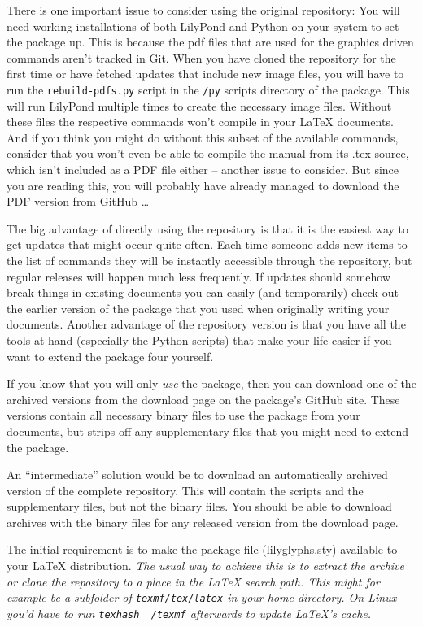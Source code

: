 \documentclass{article}
\begin{document}
There is one important issue to consider using the original repository: You will need working installations of both LilyPond and Python on your system to set the package up.
This is because the pdf files that are used for the graphics driven commands aren't tracked in Git.
When you have cloned the repository for the first time or have fetched updates that include new image files, you will have to run the \texttt{rebuild-pdfs.py} script in the \texttt{/py} scripts directory of the package.
This will run LilyPond multiple times to create the necessary image files.
Without these files the respective commands won't compile in your \LaTeX{} documents.
And if you think you might do without this subset of the available commands, consider that you won't even be able to compile the manual from its .tex source, which isn't included as a PDF file either -- another issue to consider.
But since you are reading this, you will probably have already managed to download the PDF version from GitHub \dots

The big advantage of directly using the repository is that it is the easiest way to get updates that might occur quite often. 
Each time someone adds new items to the list of commands they will be instantly accessible through the repository, but regular releases will happen much less frequently.
If updates should somehow break things in existing documents you can easily (and temporarily) check out the earlier version of the package that you used when originally writing your documents.
Another advantage of the repository version is that you have all the tools at hand (especially the Python scripts) that make your life easier if you want to extend the package four yourself.

If you know that you will only \emph{use} the \lilyglyphs package, then you can download one of the archived versions from the download page on the package's GitHub site.
These versions contain all necessary binary files to use the package from your documents, but strips off any supplementary files that you might need to extend the package.

An “intermediate” solution would be to download an automatically archived version of the complete repository. 
This will contain the scripts and the supplementary files, but not the binary files.
You should be able to download archives with the binary files for any released version from the download page.

\medskip
The initial requirement is to make the package file (lilyglyphs.sty) available to your \LaTeX{} distribution. \textit{The usual way to achieve this is to extract the archive or clone the repository to a place in the \LaTeX{} search path. This might for example be a subfolder of \texttt{texmf/tex/latex} in your home directory. On Linux you'd have to run \texttt{texhash ~/texmf} afterwards to update \LaTeX's cache.}
\end{document}
